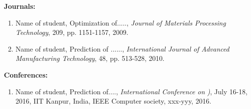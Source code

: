 {\bf Journals:}
\begin{enumerate}
\item Name of student,  Optimization of....., {\it Journal of Materials Processing Technology}, 209, pp. 1151-1157, 2009.
\item Name of student,  Prediction of ......, {\it International Journal of Advanced Manufacturing Technology}, 48, pp. 513-528, 2010. 
     


\end{enumerate}
{\bf Conferences:}
\begin{enumerate}
\item Name of student, Prediction of...., {\it International Conference on )}, July 16-18, 2016, IIT Kanpur, India, IEEE Computer society, xxx-yyy, 2016. 

\end{enumerate}